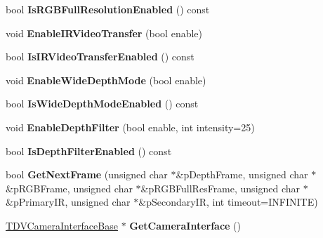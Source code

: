 \begin{DoxyCompactItemize}
\item 
\hypertarget{classCDepthCamera_a282135dd5261d925a804a20c428a07d3}{
bool {\bfseries IsRGBFullResolutionEnabled} () const }
\label{classCDepthCamera_a282135dd5261d925a804a20c428a07d3}

\item 
\hypertarget{classCDepthCamera_a22299b77c0894b278eb4430f9f734558}{
void {\bfseries EnableIRVideoTransfer} (bool enable)}
\label{classCDepthCamera_a22299b77c0894b278eb4430f9f734558}

\item 
\hypertarget{classCDepthCamera_a8578e6f5ab6ad17cf861dd1368530e34}{
bool {\bfseries IsIRVideoTransferEnabled} () const }
\label{classCDepthCamera_a8578e6f5ab6ad17cf861dd1368530e34}

\item 
\hypertarget{classCDepthCamera_aaeb19d95b8ca3d8444bcc98615088420}{
void {\bfseries EnableWideDepthMode} (bool enable)}
\label{classCDepthCamera_aaeb19d95b8ca3d8444bcc98615088420}

\item 
\hypertarget{classCDepthCamera_a727a74d77a7dc759b8dd551f547c6eb3}{
bool {\bfseries IsWideDepthModeEnabled} () const }
\label{classCDepthCamera_a727a74d77a7dc759b8dd551f547c6eb3}

\item 
\hypertarget{classCDepthCamera_a0089ad147398b91c7419c4147a62b4d0}{
void {\bfseries EnableDepthFilter} (bool enable, int intensity=25)}
\label{classCDepthCamera_a0089ad147398b91c7419c4147a62b4d0}

\item 
\hypertarget{classCDepthCamera_aa1450d0f09f22a6e9af15d0ec5a52d18}{
bool {\bfseries IsDepthFilterEnabled} () const }
\label{classCDepthCamera_aa1450d0f09f22a6e9af15d0ec5a52d18}

\item 
\hypertarget{classCDepthCamera_aba9b4149179d4116853544b431ee060a}{
bool {\bfseries GetNextFrame} (unsigned char $\ast$\&pDepthFrame, unsigned char $\ast$\&pRGBFrame, unsigned char $\ast$\&pRGBFullResFrame, unsigned char $\ast$\&pPrimaryIR, unsigned char $\ast$\&pSecondaryIR, int timeout=INFINITE)}
\label{classCDepthCamera_aba9b4149179d4116853544b431ee060a}

\item 
\hypertarget{classCDepthCamera_a7425f9f47dbe7d963e3c7601c593701f}{
\hyperlink{classTDVCameraInterfaceBase}{TDVCameraInterfaceBase} $\ast$ {\bfseries GetCameraInterface} ()}
\label{classCDepthCamera_a7425f9f47dbe7d963e3c7601c593701f}


\end{DoxyCompactItemize}
